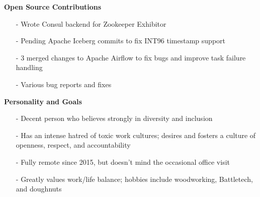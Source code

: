 \documentclass[a4paper,11pt]{article}
\begin{document}
\vspace{0.1in}

\textbf{Open Source Contributions}
\begin{itemize}
    \item[-]Wrote Consul backend for Zookeeper Exhibitor
    \item[-]Pending Apache Iceberg commits to fix INT96 timestamp support
    \item[-]3 merged changes to Apache Airflow to fix bugs and improve task failure handling
    \item[-]Various bug reports and fixes
\end{itemize}

\vspace{0.1in}
\textbf{Personality and Goals}
\begin{itemize}
    \item[-]Decent person who believes strongly in diversity and inclusion
    \item[-]Has an intense hatred of toxic work cultures; desires and fosters a culture of openness, respect, and accountability
    \item[-]Fully remote since 2015, but doesn't mind the occasional office visit
    \item[-]Greatly values work/life balance; hobbies include woodworking, Battletech, and doughnuts
\end{itemize}
\end{document}
